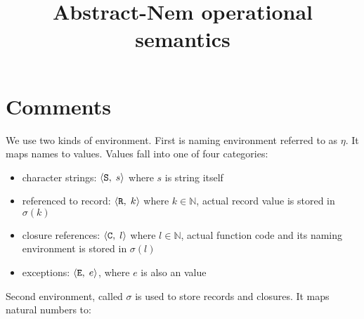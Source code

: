 \documentclass{article}
\title{Abstract-Nem operational semantics}
\date{}
\begin{document}
\newcommand{\q}[1]{{\tt #1}}
\newcommand{\pair}[2]{ \langle #1 , \; #2 \rangle }
\newcommand{\triple}[3]{ \langle #1 , \; #2 , \; #3 \rangle }
\newcommand{\computes}[2]{#1 \; \rightarrow \; #2}
\newcommand{\comprule}[3]{ 
  \begin{displaymath}
  \displaystyle 
  \frac{#1}{#2}
  #3
  \end{displaymath}
}
\newcommand{\conds}[1]{
  \;\;\;\;
  \begin{array}{l}
    #1
  \end{array}
}
\newcommand{\seta}[1]{ \triple{\sigma}{\eta}{#1} }
\newcommand{\ruleand}{\;\;\;\;\;}
\newcommand{\rulewhere}{\;\;\;{\rm where}\;\;\;}
\newcommand{\etastr}[1]{\pair{\q{S}}{#1}}
\newcommand{\etarec}[1]{\pair{\q{R}}{#1}}
\newcommand{\etaclo}[1]{\pair{\q{C}}{#1}}
\newcommand{\etaexn}[1]{\pair{\q{E}}{#1}}
\newcommand{\sigmarec}[1]{\pair{\q{R'}}{#1}}
\newcommand{\sigmaclo}[2]{\pair{\q{C'}}{\pair{#1}{#2}}}
\newcommand{\void}{\etastr{\q{''void''}}}
\newcommand{\nset}{\{ 1, \dots, n \}}

\maketitle

\section{Comments}

We use two kinds of environment. First is naming environment referred to
as $\eta$. It maps names to values. Values fall into one of four categories:

\begin{itemize}
\item character strings: $\etastr{s}$ where $s$ is string itself

\item referenced to record: $\etarec{k}$ where $k \in \mathbb{N}$, 
actual record value is stored in $\sigma(k)$

\item closure references: $\etaclo{l}$ where $l \in \mathbb{N}$, actual
function code and its naming environment is stored in $\sigma(l)$

\item exceptions: $\etaexn{e}$, where $e$ is also an value
\end{itemize}

\noindent
Second environment, called $\sigma$ is used to store records and closures.
It maps natural numbers to:
\end{document}
